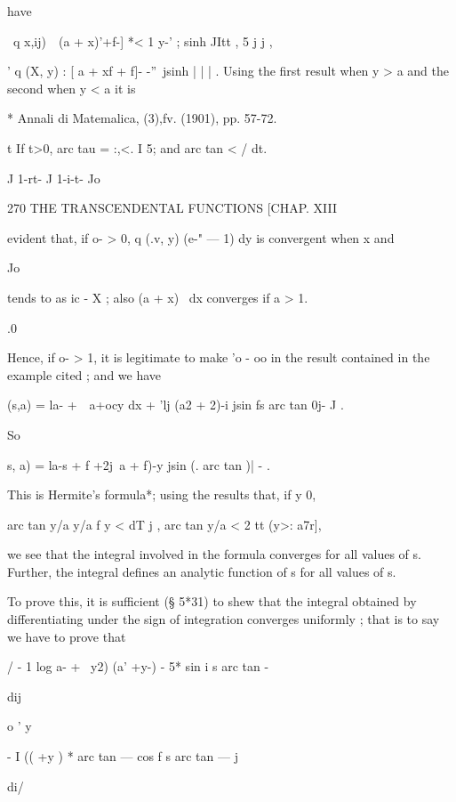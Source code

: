 have 



\ q x,ij)\ \    (a + x)'+f-]  *<  1 y-' ; sinh JItt , 5 j j , 

' q (X, y) :   [ a + xf + f]- -''\ jsinh | | | . 
Using the first result when y > a and the second when y < a it is 

* Annali di Matemalica, (3),fv. (1901), pp. 57-72. 

t If t>0, arc tau  = :,<. I 5; and arc tan  < / dt. 

J 1-rt- J 1-i-t- Jo 



270 THE TRANSCENDENTAL FUNCTIONS [CHAP. XIII 

evident that, if o- > 0, q (.v, y) (e-"  — 1)   dy is convergent when x   and 

Jo 

tends to as ic -  X ; also (a + x)~ dx converges if a > 1. 

.0 

Hence, if o- > 1, it is legitimate to make  'o  - oo in the result contained in 
the example cited ; and we have 

 (s,a) = la- +\ \    a+ocy dx + 'lj  (a2 +  2)-i  jsin fs arc tan 0j-  J  . 

So 

  s, a) = la-s + f +2j\ a  + f)-y jsin (. arc tan  )|  - . 

This is Hermite's formula*; using the results that, if y   0, 

arc tan y/a   y/a f y <   dT j , arc tan y/a < 2 tt (y>: a7r], 

we see that the integral involved in the formula converges for all values of s. 
Further, the integral defines an analytic function of s for all values of s. 

To prove this, it is sufficient (§ 5*31) to shew that the integral obtained by differentiating 
under the sign of integration converges uniformly ; that is to say we have to prove that 



/ - 1 log  a- + \ y2) (a' +y-) - 5* sin i s arc tan - 



dij 



o ' y 



- I  (( +y )  * arc tan — cos f s arc tan — j 



di/ 



